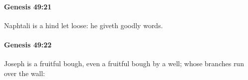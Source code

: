 		\paragraph{Genesis 49:21} %
			\label{GENESIS-49-21}

			Naphtali is a hind let loose: he giveth goodly words.


		\paragraph{Genesis 49:22} %
			\label{GENESIS-49-22}

			Joseph is a fruitful bough, even a fruitful bough by a well; whose branches run over the wall:


